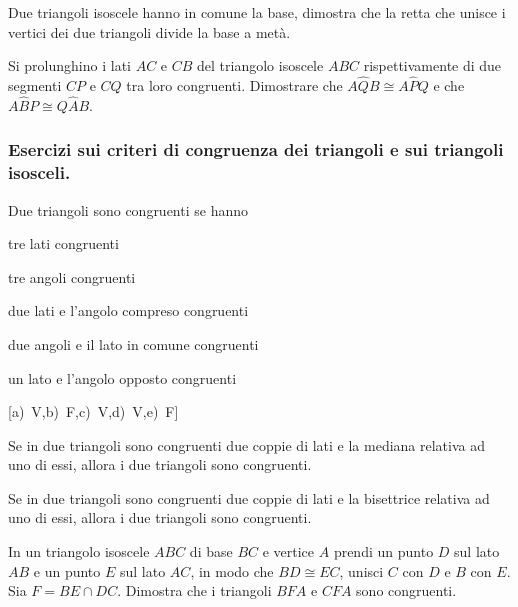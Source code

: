 \begin{multicols}{2}
\begin{esercizio}
\label{ese:2.46}
Due triangoli isoscele hanno in comune la base, dimostra che la retta 
che unisce i vertici dei due triangoli divide la base a metà.
\end{esercizio}

\begin{esercizio}
\label{ese:2.49}
Si prolunghino i lati $AC$ e $CB$ del triangolo isoscele $ABC$ 
rispettivamente di due segmenti $CP$ e $CQ$ tra loro congruenti. 
Dimostrare che $A\widehat{Q}B\cong A\widehat{P}Q$ e che 
$A\widehat{B}P\cong Q\widehat{A}B$.
\end{esercizio}

\subsubsection*{Esercizi sui criteri di congruenza dei triangoli e 
sui triangoli isosceli.}

\begin{esercizio}
\label{ese:2.54}
Due triangoli sono congruenti se hanno
\begin{enumeratea}
\item tre lati congruenti \hfill\boxV\quad\boxF
\item tre angoli congruenti \hfill\boxV\quad\boxF
\item due lati e l'angolo compreso congruenti\tab\hfill\boxV\quad\boxF
\item due angoli e il lato in comune 
congruenti\tab\hfill\boxV\quad\boxF
\item un lato e l'angolo opposto 
congruenti\tab\tab\hfill\boxV\quad\boxF
\end{enumeratea}
\hfill[a)~V,\quad b)~F,\quad c)~V,\quad d)~V,\quad e)~F]
\end{esercizio}

\begin{esercizio}
\label{ese:2.58}
Se in due triangoli sono congruenti due coppie di lati e la mediana 
relativa ad uno di essi, allora i due triangoli sono congruenti.
\end{esercizio}

\begin{esercizio}
\label{ese:2.59}
Se in due triangoli sono congruenti due coppie di lati e la 
bisettrice relativa ad uno di essi, allora i due triangoli sono 
congruenti.
\end{esercizio}

\begin{esercizio}
\label{ese:2.63}
In un triangolo isoscele $ABC$ di base $BC$ e vertice $A$ prendi un 
punto $D$ sul lato $AB$ e un punto $E$ sul lato $AC$, in modo che 
$BD\cong EC$, unisci $C$ con $D$ e $B$ con $E$. Sia $F=BE\cap DC$. 
Dimostra che i triangoli $BFA$ e $CFA$ sono congruenti.
\end{esercizio}


\end{multicols}
